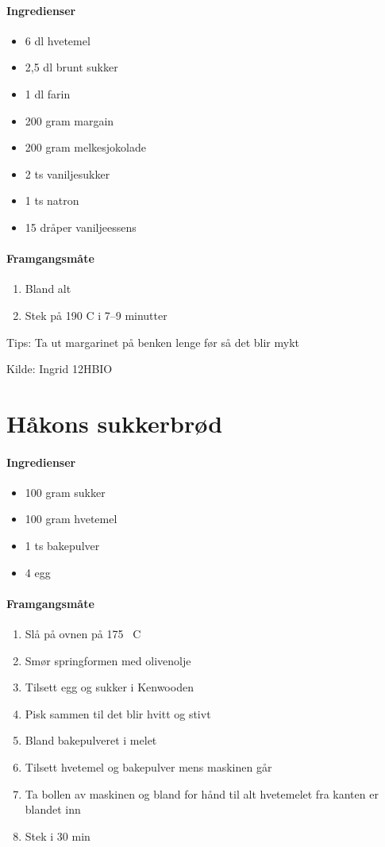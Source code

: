 \documentclass[12pt,a4paper]{book}
\begin{document}
{\paragraph{Ingredienser}
\begin{itemize}[noitemsep]
	\item 6 dl hvetemel
	\item 2,5 dl brunt sukker
	\item 1 dl farin
	\item 200 gram margain
	\item 200 gram melkesjokolade
	\item 2 ts vaniljesukker
	\item 1 ts natron
	\item 15 dråper vaniljeessens
\end{itemize}

\paragraph{Framgangsmåte}
\begin{enumerate}[noitemsep]
	\item Bland alt
	\item Stek på 190 \degree C i 7--9 minutter
\end{enumerate}

Tips: Ta ut margarinet på benken lenge før så det blir mykt

Kilde: Ingrid 12HBIO
\clearpage{}
\clearpage{}\section{﻿Håkons sukkerbrød}
\label{sukkerbrod}

\paragraph{Ingredienser}
\begin{itemize}[noitemsep]
	\item 100 gram sukker
	\item 100 gram hvetemel
	\item 1 ts bakepulver
	\item 4 egg
\end{itemize}

\paragraph{Framgangsmåte}
\begin{enumerate}[noitemsep]
	\item Slå på ovnen på 175 \degree~C
	\item Smør springformen med olivenolje
	\item Tilsett egg og sukker i Kenwooden
	\item Pisk sammen til det blir hvitt og stivt
	\item Bland bakepulveret i melet
	\item Tilsett hvetemel og bakepulver mens maskinen går
	\item Ta bollen av maskinen og bland for hånd til alt hvetemelet fra kanten er blandet inn
	\item Stek i 30 min
\end{enumerate}


}
\end{document}
